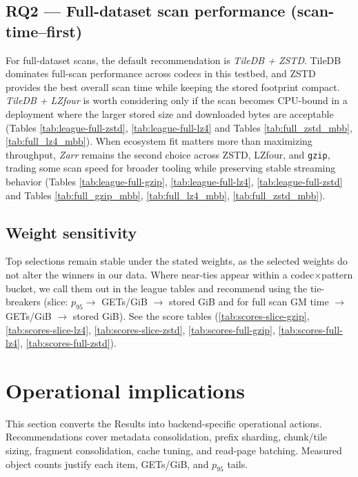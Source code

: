 \documentclass[nomenclature, english, bibtex]{kththesis}
\numberwithin{listing}{chapter}
\begin{document}
\subsection{RQ2 — Full-dataset scan performance (scan-time–first)}
For full-dataset scans, the default recommendation is \emph{TileDB + \gls{ZSTD}}. TileDB dominates full-scan performance across codecs in this testbed, and \gls{ZSTD} provides the best overall scan time while keeping the stored footprint compact. \emph{TileDB + \gls{LZfour}} is worth considering only if the scan becomes \gls{CPU}-bound in a deployment where the larger stored size and downloaded bytes are acceptable (Tables \ref{tab:league-full-zstd}, \ref{tab:league-full-lz4} and Tables \ref{tab:full_zstd_mbb}, \ref{tab:full_lz4_mbb}). When ecosystem fit matters more than maximizing throughput, \emph{Zarr} remains the second choice across \gls{ZSTD}, \gls{LZfour}, and \texttt{gzip}, trading some scan speed for broader tooling while preserving stable streaming behavior (Tables \ref{tab:league-full-gzip}, \ref{tab:league-full-lz4}, \ref{tab:league-full-zstd} and Tables \ref{tab:full_gzip_mbb}, \ref{tab:full_lz4_mbb}, \ref{tab:full_zstd_mbb}).

\subsection{Weight sensitivity}
Top selections remain stable under the stated weights, as the selected weights do not alter the winners in our data. Where near-ties appear within a codec×pattern bucket, we call them out in the league tables and recommend using the tie-breakers (slice: $p_{95}\!\rightarrow$ GETs/GiB $\rightarrow$ stored GiB and for full scan \gls{GM} time $\!\rightarrow$ GETs/GiB $\rightarrow$ stored GiB). See the score tables (\ref{tab:scores-slice-gzip}, \ref{tab:scores-slice-lz4}, \ref{tab:scores-slice-zstd}, \ref{tab:scores-full-gzip}, \ref{tab:scores-full-lz4}, \ref{tab:scores-full-zstd}).


\section{Operational implications}
This section converts the Results into backend-specific operational actions. Recommendations cover metadata consolidation, prefix sharding, chunk/tile sizing, fragment consolidation, cache tuning, and read-page batching. Measured object counts justify each item, GETs/GiB, and $p_{95}$ tails.
\end{document}
